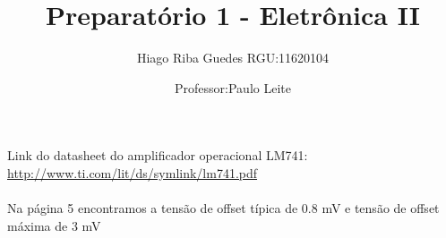 \documentclass[11pt,a4paper]{article}
\title{Preparatório 1 - Eletrônica II}
\author{Hiago Riba Guedes RGU:11620104}
\date{Professor:Paulo Leite}
\begin{document}
\maketitle

Link do datasheet do amplificador operacional LM741:\\\hyperref[label_name]{http://www.ti.com/lit/ds/symlink/lm741.pdf}\\\\
Na página 5 encontramos a tensão de offset típica de 0.8 mV e tensão de offset máxima de 3 mV 
\end{document}
